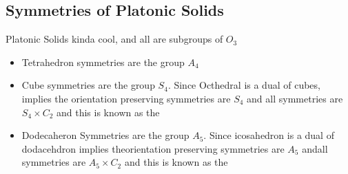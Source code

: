 \documentclass[11pt]{scrartcl}
\begin{document}
\subsection{Symmetries of Platonic Solids}
\begin{prop}
Platonic Solids kinda cool, and all are subgroups of $O_3$
\begin{itemize}
    \item Tetrahedron symmetries are the group $A_4$ 
    \item Cube symmetries are the group $S_4$. Since Octhedral is a dual of cubes, implies the orientation preserving symmetries are $S_4$ and all symmetries are $S_4 \times C_2$ and this is known as the  
    \item Dodecaheron Symmetries are the group $A_5$. Since icosahedron is a dual of dodacehdron implies theorientation preserving symmetries are $A_5$ andall symmetries are $A_5 \times C_2$ and this is known as the  
\end{itemize}

\end{prop}
\end{document}
